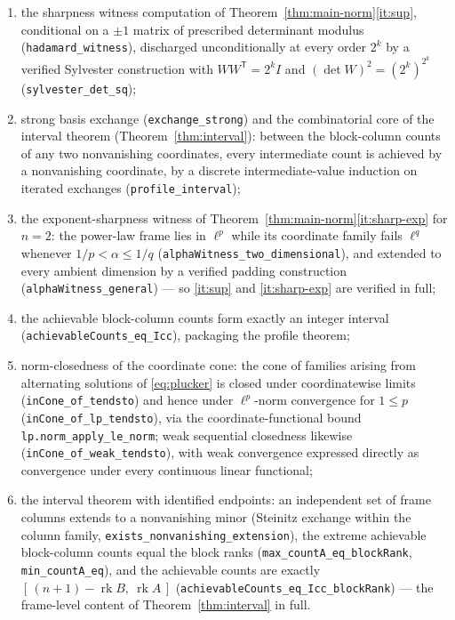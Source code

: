 \documentclass[11pt]{amsart}
\theoremstyle{definition}
\begin{document}
\begin{enumerate}[label=\textup{(\roman*)}]
\item the sharpness witness computation of Theorem~\ref{thm:main-norm}\ref{it:sup}, conditional on a $\pm1$ matrix of prescribed determinant modulus (\texttt{hadamard\_witness}), discharged unconditionally at every order $2^k$ by a verified Sylvester construction with $W W^{\mathsf T}=2^k I$ and $(\det W)^2=(2^k)^{2^k}$ (\texttt{sylvester\_det\_sq});
\item strong basis exchange (\texttt{exchange\_strong}) and the combinatorial core of the interval theorem (Theorem~\ref{thm:interval}): between the block-column counts of any two nonvanishing coordinates, every intermediate count is achieved by a nonvanishing coordinate, by a discrete intermediate-value induction on iterated exchanges (\texttt{profile\_interval});
\item the exponent-sharpness witness of Theorem~\ref{thm:main-norm}\ref{it:sharp-exp} for $n=2$: the power-law frame lies in $\ell^p$ while its coordinate family fails $\ell^q$ whenever $1/p<\alpha\le 1/q$ (\texttt{alphaWitness\_two\_dimensional}), and extended to every ambient dimension by a verified padding construction (\texttt{alphaWitness\_general}) --- so \ref{it:sup} and \ref{it:sharp-exp} are verified in full;
\item the achievable block-column counts form exactly an integer interval (\texttt{achievableCounts\_}\allowbreak\texttt{eq\_Icc}), packaging the profile theorem;
\item norm-closedness of the coordinate cone: the cone of families arising from alternating solutions of \eqref{eq:plucker} is closed under coordinatewise limits (\texttt{inCone\_of\_tendsto}) and hence under $\ell^p$-norm convergence for $1\le p$ (\texttt{inCone\_of\_lp\_tendsto}), via the coordinate-functional bound \texttt{lp.norm\_apply\_le\_norm}; weak sequential closedness likewise (\texttt{inCone\_of\_weak\_tendsto}), with weak convergence expressed directly as convergence under every continuous linear functional;
\item the interval theorem with identified endpoints: an independent set of frame columns extends to a nonvanishing minor (Steinitz exchange within the column family, \texttt{exists\_nonvanishing\_extension}), the extreme achievable block-column counts equal the block ranks (\texttt{max\_countA\_eq\_blockRank}, \texttt{min\_countA\_eq}), and the achievable counts are exactly $[\,(n{+}1)-\operatorname{rk}B,\ \operatorname{rk}A\,]$ (\texttt{achievableCounts\_eq\_Icc\_blockRank}) --- the frame-level content of Theorem~\ref{thm:interval} in full.
\end{enumerate}
\end{document}
